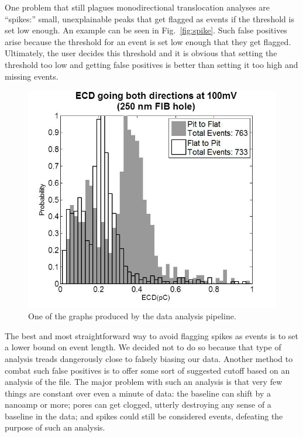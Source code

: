 \documentclass[aps,prl,preprint,groupedaddress]{revtex4}
\begin{document}
One problem that still plagues monodirectional translocation analyses are ``spikes:'' small, unexplainable peaks that get flagged as events if the threshold is set low enough.
An example can be seen in Fig.~\ref{fig:spike}.
Such false positives arise because the threshold for an event is set low enough that they get flagged.
Ultimately, the user decides this threshold and it is obvious that setting the threshold too low and getting false positives is better than setting it too high and missing events.

\begin{figure}[H]
\centering
\includegraphics[width=1\textwidth]{figures/monodirectional-ecds}
\caption{One of the graphs produced by the data analysis pipeline.}
\label{fig:ecds}
\end{figure}

The best and most straightforward way to avoid flagging spikes as events is to set a lower bound on event length.
We decided not to do so because that type of analysis treads dangerously close to falsely biasing our data.
Another method to combat such false positives is to offer some sort of suggested cutoff based on an analysis of the file.
The major problem with such an analysis is that very few things are constant over even a minute of data: the baseline can shift by a nanoamp or more; pores can get clogged, utterly destroying any sense of a baseline in the data; and spikes could still be considered events, defeating the purpose of such an analysis.
\end{document}
